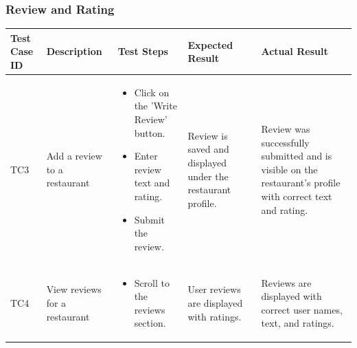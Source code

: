 \documentclass[12pt, a4paper, oneside]{article}
\begin{document}
\subsubsection{Review and Rating}
\captionsetup{type=table}
\begin{tabularx}{\textwidth}{|X|X|X|X|X|}
	\hline
	\rowcolor{gray}
	\textbf{Test Case ID} & \textbf{Description} & \textbf{Test Steps} & \textbf{Expected Result} & \textbf{Actual Result}  \\ \hline
	TC3 & Add a review to a restaurant & 
    \begin{itemize}[left=0pt, nosep]
        \item Click on the 'Write Review' button.
        \item Enter review text and rating.
        \item Submit the review.
    \end{itemize}
    & Review is saved and displayed under the restaurant profile. & Review was successfully submitted and is visible on the restaurant’s profile with correct text and rating. \\ \hline
	TC4 & View reviews for a restaurant & 
    \begin{itemize}[left=0pt, nosep]
        \item Scroll to the reviews section.
    \end{itemize}
    & User reviews are displayed with ratings. & Reviews are displayed with correct user names, text, and ratings. \\ \hline
\end{tabularx}
\label{tab:review-rating}
\end{document}

